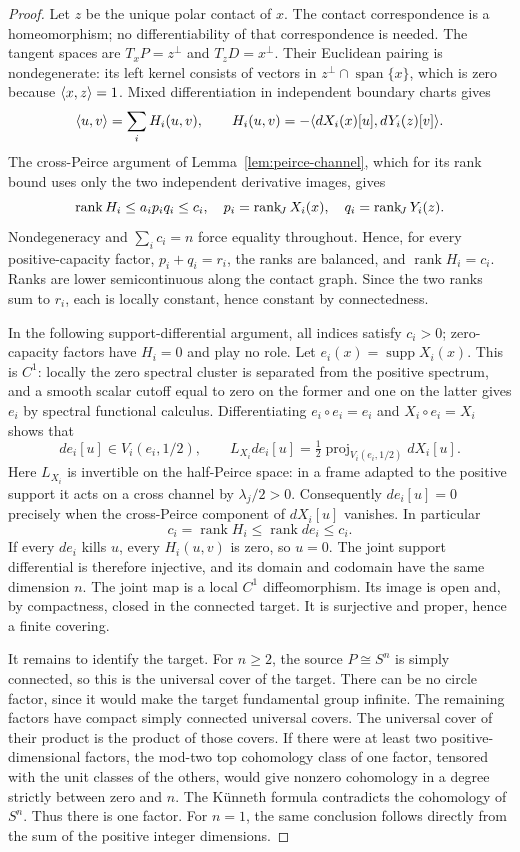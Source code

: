 \begin{proof}
Let $z$ be the unique polar contact of $x$. The contact correspondence is
a homeomorphism; no differentiability of that correspondence is needed.
The tangent spaces are $T_xP=z^\perp$ and $T_zD=x^\perp$.
Their Euclidean pairing is nondegenerate: its left kernel consists of
vectors in $z^\perp\cap\operatorname{span}\{x\}$, which is zero because
$\langle x,z\rangle=1$. Mixed differentiation in independent boundary charts gives
\[
 \langle u,v\rangle=\sum_i H_i(u,v),\qquad
 H_i(u,v)=-\langle dX_i(x)[u],dY_i(z)[v]\rangle.
\]
The cross-Peirce argument of Lemma~\ref{lem:peirce-channel}, which for its
rank bound uses only the two independent derivative images, gives
\[
 \operatorname{rank}H_i\leq a_ip_iq_i\leq c_i,
 \quad p_i=\operatorname{rank}_{\!J} X_i(x),\quad q_i=\operatorname{rank}_{\!J} Y_i(z).
\]
Nondegeneracy and $\sum_i c_i=n$ force equality throughout. Hence, for
every positive-capacity factor,
$p_i+q_i=r_i$, the ranks are balanced, and $\operatorname{rank}H_i=c_i$.
Ranks are lower semicontinuous along the contact graph. Since the two
ranks sum to $r_i$, each is locally constant, hence constant by
connectedness.

In the following support-differential argument, all indices satisfy
$c_i>0$; zero-capacity factors have $H_i=0$ and play no role.
Let $e_i(x)=\operatorname{supp}X_i(x)$. This is $C^1$: locally the zero
spectral cluster is separated from the positive spectrum, and a smooth
scalar cutoff equal to zero on the former and one on the latter gives
$e_i$ by spectral functional calculus. Differentiating
$e_i\circ e_i=e_i$ and $X_i\circ e_i=X_i$ shows that
\[
 de_i[u]\in V_i(e_i,1/2),\qquad
 L_{X_i}de_i[u]=\tfrac12\operatorname{proj}_{V_i(e_i,1/2)}dX_i[u].
\]
Here $L_{X_i}$ is invertible on the half-Peirce space: in a frame adapted
to the positive support it acts on a cross channel by $\lambda_j/2>0$.
Consequently $de_i[u]=0$ precisely when the cross-Peirce component of
$dX_i[u]$ vanishes. In particular
\[
 c_i=\operatorname{rank}H_i\leq\operatorname{rank}de_i\leq c_i.
\]
If every $de_i$ kills $u$, every $H_i(u,v)$ is zero, so $u=0$.
The joint support differential is therefore injective, and its domain and
codomain have the same dimension $n$. The joint map is a local
$C^1$ diffeomorphism. Its image is open and, by compactness, closed in the
connected target. It is surjective and proper, hence a finite covering.

It remains to identify the target. For $n\geq2$, the
source $P\cong S^n$ is simply connected, so this is the universal cover of
the target. There can be no circle factor, since it would make the target
fundamental group infinite. The remaining factors have compact simply
connected universal covers. The universal cover of their product is the
product of those covers. If there were at least two positive-dimensional
factors, the mod-two top cohomology class of one factor, tensored with the
unit classes of the others, would give nonzero cohomology in a degree
strictly between zero and $n$. The K\"unneth formula contradicts the
cohomology of $S^n$. Thus there is one factor. For $n=1$, the same conclusion
follows directly from the sum of the positive integer dimensions.


\end{proof}
